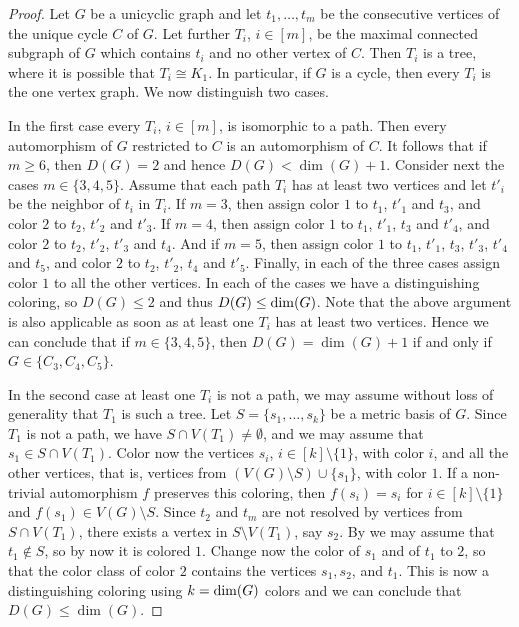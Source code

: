 \documentclass[12pt]{article}
\begin{document}
\begin{proof}
Let $G$ be a unicyclic graph and let $t_1, \ldots, t_m$ be the consecutive vertices of the unique cycle $C$ of $G$. Let further $T_i$, $i\in [m]$, be the maximal connected subgraph of $G$ which contains $t_i$ and no other vertex of $C$. Then $T_i$ is a tree, where it is possible that $T_i\cong K_1$. In particular, if $G$ is a cycle, then every $T_i$ is the one vertex graph. We now distinguish two cases. 

In the first case every $T_i$, $i\in [m]$, is isomorphic to a path. Then every automorphism of $G$ restricted to $C$ is an automorphism of $C$. It follows that if $m \geq 6$, then $D(G)=2$ and hence $D(G) < \dim(G) + 1$. Consider next the cases $m\in \{3,4,5\}$. Assume that each path $T_i$ has at least two vertices and let $t'_i$ be the neighbor of $t_i$ in $T_i$. If $m = 3$, then assign color $1$ to $t_1$, $t'_1$ and $t_3$, and color $2$ to $t_2$, $t'_2$ and $t'_3$. If $m = 4$, then assign color $1$ to $t_1$, $t'_1$, $t_3$ and $t'_4$, and color $2$ to $t_2$, $t'_2$, $t'_3$ and $t_4$. And if $m = 5$, then assign color $1$ to $t_1$, $t'_1$, $t_3$, $t'_3$, $t'_4$ and $t_5$, and color $2$ to $t_2$, $t'_2$, $t_4$ and $t'_5$. Finally, in each of the three cases assign color $1$ to all the other vertices. In each of the cases we have a distinguishing coloring, so $D(G)\le 2$ and thus $D(G) \leq {\rm dim}(G)$. Note that the above argument is also applicable as soon as at least one $T_i$ has at least two vertices. Hence we can conclude that if $m\in \{3,4,5\}$, then $D(G) = \dim(G) + 1$ if and only if $G\in \{C_3, C_4, C_5\}$. 

In the second case at least one $T_i$ is not a path, we may assume without loss of generality that $T_1$ is such a tree. Let $S=\{s_1, \ldots, s_k\}$ be a metric basis of $G$.  Since $T_1$ is not a path, we have $S \cap V(T_1) \neq \emptyset$, and we may  assume that $s_1 \in S \cap V(T_1)$. Color now the vertices $s_i$, $i\in [k]\setminus \{1\}$, with color $i$, and all the other vertices, that is, vertices from $(V(G)\setminus S) \cup \{s_1\}$, with color $1$. If a non-trivial automorphism $f$ preserves this coloring, then $f(s_i) = s_i$ for $i\in [k]\setminus \{1\}$ and $f(s_1)\in V(G)\setminus S$. Since $t_2$ and $t_m$ are not resolved by vertices from $S \cap V(T_1)$, there exists a vertex in $S \setminus V(T_1)$, say $s_2$. By \cite[Corollary 7]{Hakanen} we may assume that $t_1 \notin S$, so by now it is colored $1$. Change now the color of $s_1$ and of $t_1$ to $2$, so that the color class of color $2$ contains the vertices $s_1, s_2$, and $t_1$. This is now a distinguishing coloring using $k = {\rm dim}(G)$ colors and we can conclude that $D(G) \le \dim(G)$.
\end{proof}
\end{document}

